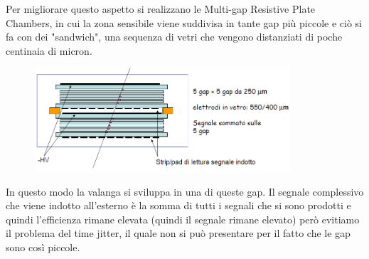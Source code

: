 Per migliorare questo aspetto si realizzano le Multi-gap Resistive Plate Chambers, in cui la zona sensibile viene suddivisa in tante gap più piccole e ciò si fa con dei "sandwich", una sequenza di vetri che vengono distanziati di poche centinaia di micron. 
\begin{figure}[H]
   \centering
   \includegraphics[width=0.85\textwidth]{immagini/MRPC_1.png}
\end{figure}
In questo modo la valanga si sviluppa in una di queste gap. Il segnale complessivo che viene indotto all'esterno è la somma di tutti i segnali che si sono prodotti e quindi l'efficienza rimane elevata (quindi il segnale rimane elevato) però evitiamo il problema del time jitter, il quale non si può presentare per il fatto che le gap sono così piccole.

